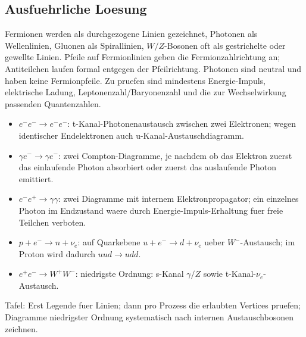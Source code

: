 \documentclass[11pt,a4paper]{scrartcl}
\begin{document}
\subsection{Ausfuehrliche Loesung}
\begin{calculationbox}[title={Regeln}]
Fermionen werden als durchgezogene Linien gezeichnet, Photonen als Wellenlinien, Gluonen als Spirallinien, \(W/Z\)-Bosonen oft als gestrichelte oder gewellte Linien. Pfeile auf Fermionlinien geben die Fermionzahlrichtung an; Antiteilchen laufen formal entgegen der Pfeilrichtung. Photonen sind neutral und haben keine Fermionpfeile. Zu pruefen sind mindestens Energie-Impuls, elektrische Ladung, Leptonenzahl/Baryonenzahl und die zur Wechselwirkung passenden Quantenzahlen.
\end{calculationbox}
\begin{calculationbox}[title={Niedrigste Ordnungen}]
\begin{itemize}
\item \(e^-e^-\to e^-e^-\): t-Kanal-Photonenaustausch zwischen zwei Elektronen; wegen identischer Endelektronen auch u-Kanal-Austauschdiagramm.
\item \(\gamma e^-\to\gamma e^-\): zwei Compton-Diagramme, je nachdem ob das Elektron zuerst das einlaufende Photon absorbiert oder zuerst das auslaufende Photon emittiert.
\item \(e^-e^+\to\gamma\gamma\): zwei Diagramme mit internem Elektronpropagator; ein einzelnes Photon im Endzustand waere durch Energie-Impuls-Erhaltung fuer freie Teilchen verboten.
\item \(p+e^-\to n+\nu_e\): auf Quarkebene \(u+e^-\to d+\nu_e\) ueber \(W^-\)-Austausch; im Proton wird dadurch \(uud\to udd\).
\item \(e^+e^-\to W^+W^-\): niedrigste Ordnung: s-Kanal \(\gamma/Z\) sowie t-Kanal-\(\nu_e\)-Austausch.
\end{itemize}
\end{calculationbox}
\begin{center}
\end{center}
\begin{talkbox}Tafel: Erst Legende fuer Linien; dann pro Prozess die erlaubten Vertices pruefen; Diagramme niedrigster Ordnung systematisch nach internen Austauschbosonen zeichnen.\end{talkbox}
\end{document}
